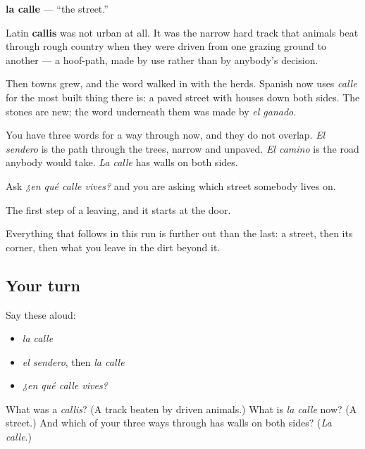 \begin{cousinweb}
\textbf{la calle} — \textquotedblleft{}the street.\textquotedblright{}

Latin \textbf{callis} was not urban at all. It was the narrow hard track that animals beat through rough country when they were driven from one grazing ground to another — a hoof-path, made by use rather than by anybody's decision.

Then towns grew, and the word walked in with the herds. Spanish now uses \emph{calle} for the most built thing there is: a paved street with houses down both sides. The stones are new; the word underneath them was made by \emph{el ganado}.

You have three words for a way through now, and they do not overlap. \emph{El sendero} is the path through the trees, narrow and unpaved. \emph{El camino} is the road anybody would take. \emph{La calle} has walls on both sides.

Ask \emph{¿en qué calle vives?} and you are asking which street somebody lives on.
\end{cousinweb}

\begin{grammarlens}[title={What you've built}]
The first step of a leaving, and it starts at the door.

Everything that follows in this run is further out than the last: a street, then its corner, then what you leave in the dirt beyond it.
\end{grammarlens}

\subsection*{Your turn}
Say these aloud:

\begin{itemize}
\raggedright
  \item \emph{la calle}
  \item \emph{el sendero}, then \emph{la calle}
  \item \emph{¿en qué calle vives?}
\end{itemize}

\begin{tcolorbox}[breakable,colback=teal!4,colframe=teal!35!black,title={Before you move on}]
What was a \emph{callis}? (A track beaten by driven animals.) What is \emph{la calle} now? (A street.) And which of your three ways through has walls on both sides? (\emph{La calle}.)
\end{tcolorbox}
